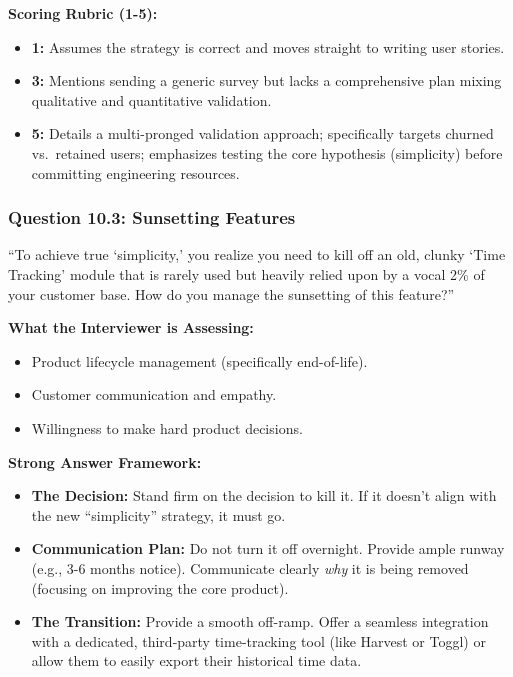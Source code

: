 \documentclass[
  11pt,
  openany,
  oneside]{book}
\providecommand{\tightlist}{%
  \setlength{\itemsep}{0pt}\setlength{\parskip}{0pt}}
\begin{document}
\textbf{Scoring Rubric (1-5):}

\begin{itemize}
\tightlist
\item
  \textbf{1:} Assumes the strategy is correct and moves straight to
  writing user stories.
\item
  \textbf{3:} Mentions sending a generic survey but lacks a
  comprehensive plan mixing qualitative and quantitative validation.
\item
  \textbf{5:} Details a multi-pronged validation approach; specifically
  targets churned vs.~retained users; emphasizes testing the core
  hypothesis (simplicity) before committing engineering resources.
\end{itemize}

\subsubsection{Question 10.3: Sunsetting
Features}\label{question-10.3-sunsetting-features}

``To achieve true `simplicity,' you realize you need to kill off an old,
clunky `Time Tracking' module that is rarely used but heavily relied
upon by a vocal 2\% of your customer base. How do you manage the
sunsetting of this feature?''

\textbf{What the Interviewer is Assessing:}

\begin{itemize}
\tightlist
\item
  Product lifecycle management (specifically end-of-life).
\item
  Customer communication and empathy.
\item
  Willingness to make hard product decisions.
\end{itemize}

\textbf{Strong Answer Framework:}

\begin{itemize}
\tightlist
\item
  \textbf{The Decision:} Stand firm on the decision to kill it. If it
  doesn't align with the new ``simplicity'' strategy, it must go.
\item
  \textbf{Communication Plan:} Do not turn it off overnight. Provide
  ample runway (e.g., 3-6 months notice). Communicate clearly \emph{why}
  it is being removed (focusing on improving the core product).
\item
  \textbf{The Transition:} Provide a smooth off-ramp. Offer a seamless
  integration with a dedicated, third-party time-tracking tool (like
  Harvest or Toggl) or allow them to easily export their historical time
  data.
\end{itemize}
\end{document}
